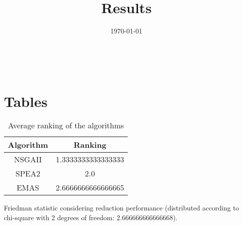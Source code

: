 \documentclass{article}
\title{Results}
\author{}
\date{\today}
\begin{document}
\oddsidemargin 0in \topmargin 0in\maketitle
\
\section{Tables}
\begin{table}[!htp]
\centering
\caption{Average ranking of the algorithms}
\begin{tabular}{c|c}
Algorithm&Ranking\\
\hline
NSGAII&1.3333333333333333\\
SPEA2&2.0\\
EMAS&2.6666666666666665\\
\end{tabular}
\end{table}


Friedman statistic considering reduction performance (distributed according to chi-square with 2 degrees of freedom: 2.666666666666668).
\end{document}
